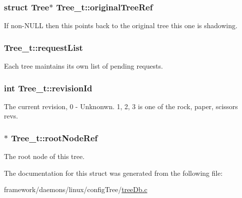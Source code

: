 \subsubsection[{\texorpdfstring{original\+Tree\+Ref}{originalTreeRef}}]{\setlength{\rightskip}{0pt plus 5cm}struct Tree$\ast$ Tree\+\_\+t\+::original\+Tree\+Ref}\hypertarget{struct_tree__t_a75173f5c0fb4cb33070e2b1c820e0d86}{}\label{struct_tree__t_a75173f5c0fb4cb33070e2b1c820e0d86}
If non-\/\+N\+U\+LL then this points back to the original tree this one is shadowing. 
\subsubsection[{\texorpdfstring{request\+List}{requestList}}]{ Tree\+\_\+t\+::request\+List}\hypertarget{struct_tree__t_a4c1844aea3992bca846ef3b3060f0f59}{}\label{struct_tree__t_a4c1844aea3992bca846ef3b3060f0f59}
Each tree maintains it\textquotesingle{}s own list of pending requests. 
\subsubsection[{\texorpdfstring{revision\+Id}{revisionId}}]{\setlength{\rightskip}{0pt plus 5cm}int Tree\+\_\+t\+::revision\+Id}\hypertarget{struct_tree__t_a7d48331e220d257dda8285ac9ef8d9c1}{}\label{struct_tree__t_a7d48331e220d257dda8285ac9ef8d9c1}
The current revision, 0 -\/ Unknonwn. 1, 2, 3 is one of the rock, paper, scissors revs. 
\subsubsection[{\texorpdfstring{root\+Node\+Ref}{rootNodeRef}}]{$\ast$ Tree\+\_\+t\+::root\+Node\+Ref}\hypertarget{struct_tree__t_afe42fdc017a177fcdcaa3a9e8fbbd255}{}\label{struct_tree__t_afe42fdc017a177fcdcaa3a9e8fbbd255}


The root node of this tree. 



The documentation for this struct was generated from the following file\+:\begin{DoxyCompactItemize}
\item 
framework/daemons/linux/config\+Tree/\hyperlink{tree_db_8c}{tree\+Db.\+c}\end{DoxyCompactItemize}
